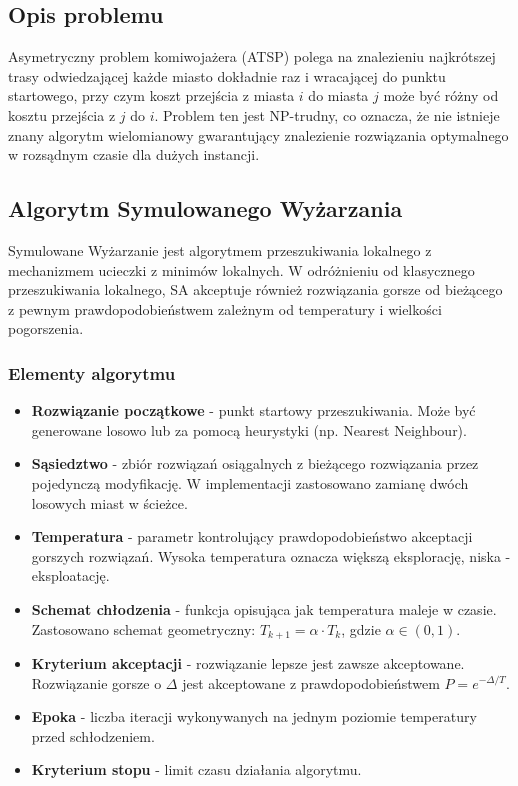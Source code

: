 \documentclass[a4paper,12pt]{article}
\begin{document}
\subsection{Opis problemu}

Asymetryczny problem komiwojażera (ATSP) polega na znalezieniu najkrótszej trasy odwiedzającej każde miasto dokładnie raz
i wracającej do punktu startowego, przy czym koszt przejścia z miasta $i$ do miasta $j$ może być różny od kosztu przejścia z $j$ do $i$.
Problem ten jest NP-trudny, co oznacza, że nie istnieje znany algorytm wielomianowy gwarantujący znalezienie rozwiązania optymalnego
w rozsądnym czasie dla dużych instancji.

\subsection{Algorytm Symulowanego Wyżarzania}

Symulowane Wyżarzanie jest algorytmem przeszukiwania lokalnego z mechanizmem ucieczki z minimów lokalnych.
W odróżnieniu od klasycznego przeszukiwania lokalnego, SA akceptuje również rozwiązania gorsze od bieżącego
z pewnym prawdopodobieństwem zależnym od temperatury i wielkości pogorszenia.

\subsubsection{Elementy algorytmu}

\begin{itemize}
    \item \textbf{Rozwiązanie początkowe} - punkt startowy przeszukiwania. Może być generowane losowo lub za pomocą heurystyki (np. Nearest Neighbour).
    \item \textbf{Sąsiedztwo} - zbiór rozwiązań osiągalnych z bieżącego rozwiązania przez pojedynczą modyfikację. W implementacji zastosowano zamianę dwóch losowych miast w ścieżce.
    \item \textbf{Temperatura} - parametr kontrolujący prawdopodobieństwo akceptacji gorszych rozwiązań. Wysoka temperatura oznacza większą eksplorację, niska - eksploatację.
    \item \textbf{Schemat chłodzenia} - funkcja opisująca jak temperatura maleje w czasie. Zastosowano schemat geometryczny: $T_{k+1} = \alpha \cdot T_k$, gdzie $\alpha \in (0, 1)$.
    \item \textbf{Kryterium akceptacji} - rozwiązanie lepsze jest zawsze akceptowane. Rozwiązanie gorsze o $\Delta$ jest akceptowane z prawdopodobieństwem $P = e^{-\Delta / T}$.
    \item \textbf{Epoka} - liczba iteracji wykonywanych na jednym poziomie temperatury przed schłodzeniem.
    \item \textbf{Kryterium stopu} - limit czasu działania algorytmu.
\end{itemize}
\end{document}
